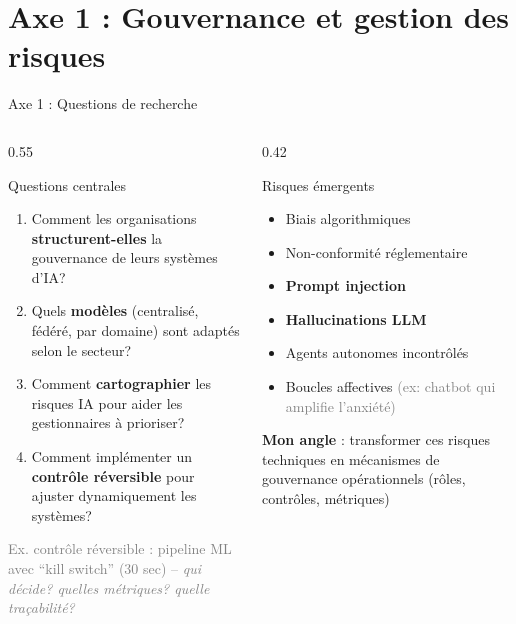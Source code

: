 \documentclass[aspectratio=169,11pt]{beamer}
\begin{document}
\section{Axe 1 : Gouvernance et gestion des risques}

\begin{frame}{Axe 1 : Questions de recherche}
  \begin{columns}[T]
    \begin{column}{0.55\textwidth}
      \begin{block}{Questions centrales}
        \begin{enumerate}\small
          \item Comment les organisations \textbf{structurent-elles} la gouvernance de leurs systèmes d'IA?
          \item Quels \textbf{modèles} (centralisé, fédéré, par domaine) sont adaptés selon le secteur?
          \item Comment \textbf{cartographier} les risques IA pour aider les gestionnaires à prioriser?
          \item Comment implémenter un \textbf{contrôle réversible} pour ajuster dynamiquement les systèmes?
        \end{enumerate}
        
        \vspace{0.2em}
        {\scriptsize\textcolor{gray}{Ex. contrôle réversible : pipeline ML avec ``kill switch'' (30 sec) -- \textit{qui décide? quelles métriques? quelle traçabilité?}}}
      \end{block}
    \end{column}
    \begin{column}{0.42\textwidth}
      \begin{alertblock}{Risques émergents}
        \begin{itemize}\small
          \item Biais algorithmiques
          \item Non-conformité réglementaire
          \item \textbf{Prompt injection}
          \item \textbf{Hallucinations LLM}
          \item Agents autonomes incontrôlés
          \item Boucles affectives {\scriptsize\textcolor{gray}{(ex: chatbot qui amplifie l'anxiété)}}
        \end{itemize}
      \end{alertblock}
      
      \vspace{0.2em}
      
      {\scriptsize\textcolor{axe1color}{\textbf{Mon angle} : transformer ces risques techniques en mécanismes de gouvernance opérationnels (rôles, contrôles, métriques)}}
    \end{column}
  \end{columns}
\end{frame}
\end{document}

